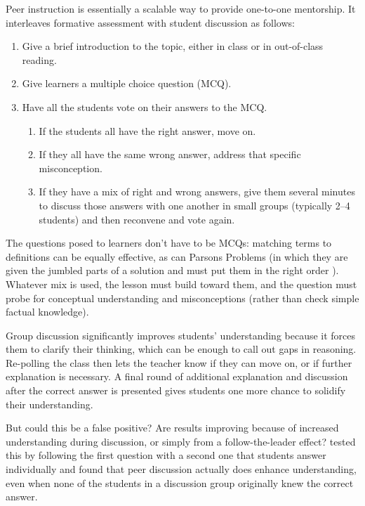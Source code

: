 \documentclass[10pt,letterpaper]{article}
\begin{document}
Peer instruction is essentially a scalable way to provide one-to-one mentorship.
It interleaves formative assessment with student discussion as follows:

\begin{enumerate}

\item Give a brief introduction to the topic, either in class or in out-of-class
  reading.

\item Give learners a multiple choice question (MCQ).

\item Have all the students vote on their answers to the MCQ.

  \begin{enumerate}

   \item If the students all have the right answer, move on.

   \item If they all have the same wrong answer, address that specific
     misconception.

   \item If they have a mix of right and wrong answers, give them several
     minutes to discuss those answers with one another in small groups
     (typically 2--4 students) and then reconvene and vote again.

  \end{enumerate}

\end{enumerate}

The questions posed to learners don't have to be MCQs: matching terms to
definitions can be equally effective, as can Parsons Problems (in which they are
given the jumbled parts of a solution and must put them in the right order
\cite{Pars2006}).  Whatever mix is used, the lesson must build toward them, and
the question must probe for conceptual understanding and misconceptions (rather
than check simple factual knowledge).

Group discussion significantly improves students' understanding because it
forces them to clarify their thinking, which can be enough to call out gaps in
reasoning.  Re-polling the class then lets the teacher know if they can move on,
or if further explanation is necessary. A final round of additional explanation
and discussion after the correct answer is presented gives students one more
chance to solidify their understanding.

But could this be a false positive? Are results improving because of increased
understanding during discussion, or simply from a follow-the-leader effect?
\cite{Smit2009} tested this by following the first question with a second one
that students answer individually and found that peer discussion actually does
enhance understanding, even when none of the students in a discussion group
originally knew the correct answer.
\end{document}
